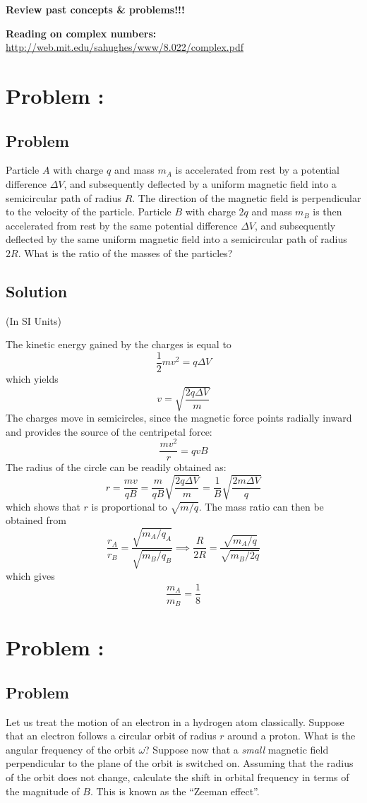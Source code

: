 \documentclass[solutions]{esg8022pset}
\date{\today }
\begin{document}
  \noindent \textbf{Review past concepts \& problems!!!}

  \noindent \textbf{Reading on complex numbers:} \url{http://web.mit.edu/sahughes/www/8.022/complex.pdf}
\section{Problem \thesection: }
\subsection{Problem}
  Particle $A$ with charge $q$ and mass $m_A$ is accelerated from rest by a potential difference $\Delta V$, and subsequently deflected by a uniform magnetic field into a semicircular path of radius $R$.  The direction of the magnetic field is perpendicular to the velocity of the particle.  Particle $B$ with charge $2q$ and mass $m_B$ is then accelerated from rest by the same potential difference $\Delta V$, and subsequently deflected by the same uniform magnetic field into a semicircular path of radius $2R$.  What is the ratio of the masses of the particles?
\subsection{Solution}
  (In SI Units)

  The kinetic energy gained by the charges is equal to
  $$\frac12 mv^2 = q\Delta V$$
  which yields
  $$v = \sqrt{\frac{2q \Delta V}{m}}$$
  The charges move in semicircles, since the magnetic force points radially inward and provides the source of the centripetal force:
  $$\frac{mv^2}{r} = qvB$$
  The radius of the circle can be readily obtained as:
  $$r = \frac{mv}{qB} = \frac{m}{qB}\sqrt{\frac{2q\Delta V}{m}} = \frac{1}{B}\sqrt{\frac{2m\Delta V}{q}}$$
  which shows that $r$ is proportional to $\sqrt{m/q}$. The mass ratio can then be obtained from
  $$\frac{r_A}{r_B} = \frac{\sqrt{m_A / q_A}}{\sqrt{m_B / q_B}} \implies \frac{R}{2R} = \frac{\sqrt{m_A / q}}{\sqrt{m_B / 2q}}$$
  which gives
  $$\frac{m_A}{m_B} = \frac18$$
\section{Problem \thesection: }
\subsection{Problem}
  Let us treat the motion of an electron in a hydrogen atom classically. Suppose that an electron follows a circular orbit of radius $r$ around a proton. What is the angular frequency of the orbit $\omega$? Suppose now that a \emph{small} magnetic field perpendicular to the plane of the orbit is switched on. Assuming that the radius of the orbit does not change, calculate the shift in orbital frequency in terms of the magnitude of $B$. This is known as the ``Zeeman effect''.
\end{document}
